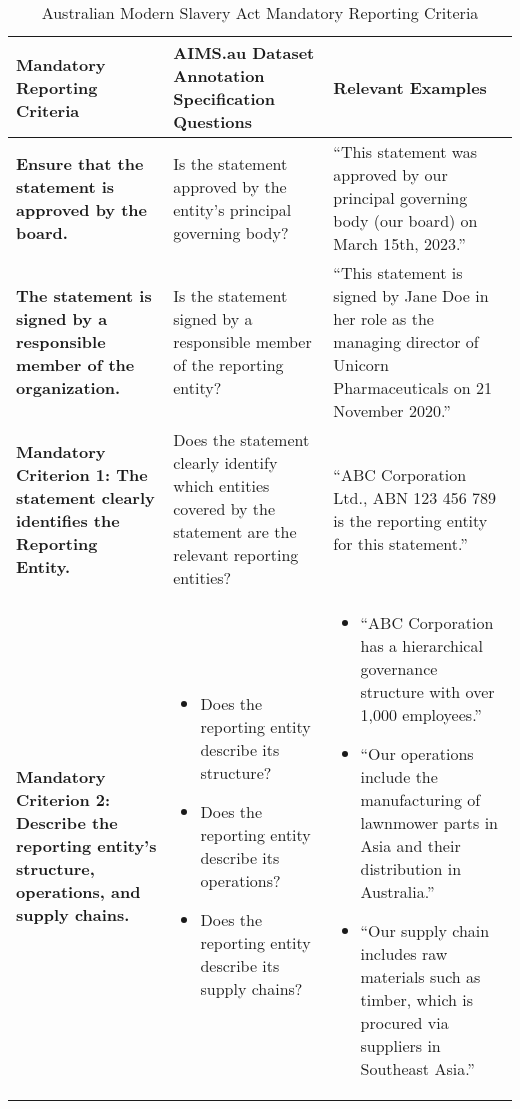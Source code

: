 \documentclass{article}
\begin{document}
\begin{table}[ht]
\centering
\caption{Australian Modern Slavery Act Mandatory Reporting Criteria}
\label{tab:modern_slavery_reporting}
\begin{tabularx}{\textwidth}{@{}p{4.5cm}p{5cm}p{5cm}@{}}
\toprule
\textbf{Mandatory Reporting Criteria} & \textbf{AIMS.au Dataset Annotation Specification Questions} & \textbf{Relevant Examples} \\
\midrule

\textbf{Ensure that the statement is approved by the board.} & 
Is the statement approved by the entity's principal governing body? &
``This statement was approved by our principal governing body (our board) on March 15th, 2023.'' \\

\textbf{The statement is signed by a responsible member of the organization.} & 
Is the statement signed by a responsible member of the reporting entity? &
``This statement is signed by Jane Doe in her role as the managing director of Unicorn Pharmaceuticals on 21 November 2020.'' \\

\textbf{Mandatory Criterion 1: The statement clearly identifies the Reporting Entity.} & 
Does the statement clearly identify which entities covered by the statement are the relevant reporting entities? &
``ABC Corporation Ltd., ABN 123 456 789 is the reporting entity for this statement.'' \\

\textbf{Mandatory Criterion 2: Describe the reporting entity’s structure, operations, and supply chains.} & 
\begin{itemize}[leftmargin=*]
    \item Does the reporting entity describe its structure?
    \item Does the reporting entity describe its operations?
    \item Does the reporting entity describe its supply chains?
\end{itemize} &
\begin{itemize}[leftmargin=*]
    \item ``ABC Corporation has a hierarchical governance structure with over 1,000 employees.''
    \item ``Our operations include the manufacturing of lawnmower parts in Asia and their distribution in Australia.''
    \item ``Our supply chain includes raw materials such as timber, which is procured via suppliers in Southeast Asia.''
\end{itemize} \\


\end{tabularx}
\end{table}
\end{document}
